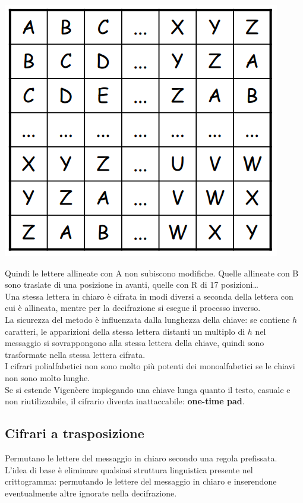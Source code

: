 \documentclass[10pt]{book}
\begin{document}
\begin{list}{}{}
	\begin{center}
		\includegraphics[scale=0.5]{6.png}
	\end{center}
	Quindi le lettere allineate con A non subiscono modifiche. Quelle allineate con B sono traslate di una posizione in avanti, quelle con R di 17 posizioni\ldots\\
	Una stessa lettera in chiaro è cifrata in modi diversi a seconda della lettera con cui è allineata, mentre per la decifrazione si esegue il processo inverso.\\
	La sicurezza del metodo è influenzata dalla lunghezza della chiave: se contiene $h$ caratteri, le apparizioni della stessa lettera distanti un multiplo di $h$ nel messaggio si sovrappongono alla stessa lettera della chiave, quindi sono trasformate nella stessa lettera cifrata.\\
	I cifrari polialfabetici non sono molto più potenti dei monoalfabetici se le chiavi non sono molto lunghe.\\
	Se si estende Vigenèere impiegando una chiave lunga quanto il testo, casuale e non riutilizzabile, il cifrario diventa inattaccabile: \textbf{one-time pad}.
\end{list}
\subsection{Cifrari a trasposizione} Permutano le lettere del messaggio in chiaro secondo una regola prefissata.\\
L'idea di base è eliminare qualsiasi struttura linguistica presente nel crittogramma: permutando le lettere del messaggio in chiaro e inserendone eventualmente altre ignorate nella decifrazione.
\end{document}
